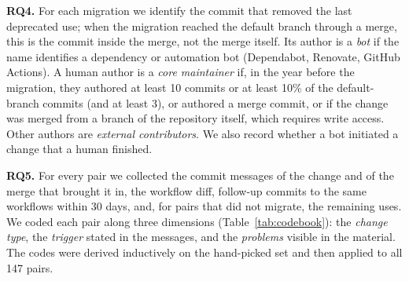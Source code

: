 \textbf{RQ4.}
For each migration we identify the commit that removed the last deprecated use; when the migration reached the default branch through a merge, this is the commit inside the merge, not the merge itself.
Its author is a \emph{bot} if the name identifies a dependency or automation bot (Dependabot, Renovate, GitHub Actions).
A human author is a \emph{core maintainer} if, in the year before the migration, they authored at least 10 commits or at least 10\% of the default-branch commits (and at least 3), or authored a merge commit, or if the change was merged from a branch of the repository itself, which requires write access.
Other authors are \emph{external contributors}.
We also record whether a bot initiated a change that a human finished.

\textbf{RQ5.}
For every pair we collected the commit messages of the change and of the merge that brought it in, the workflow diff, follow-up commits to the same workflows within 30 days, and, for pairs that did not migrate, the remaining uses.
We coded each pair along three dimensions (Table~\ref{tab:codebook}): the \emph{change type}, the \emph{trigger} stated in the messages, and the \emph{problems} visible in the material.
The codes were derived inductively on the hand-picked set and then applied to all 147 pairs.

